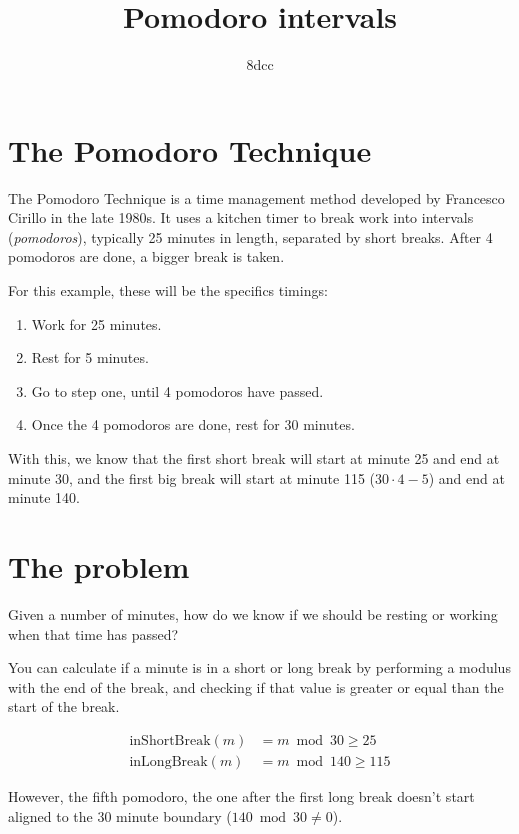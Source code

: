 \documentclass{amsart}
\title{Pomodoro intervals}
\author{8dcc}
\begin{document}
\maketitle

\section{The Pomodoro Technique}

The Pomodoro Technique is a time management method developed by Francesco
Cirillo in the late 1980s. It uses a kitchen timer to break work into intervals
(\textit{pomodoros}), typically 25 minutes in length, separated by short
breaks. After 4 pomodoros are done, a bigger break is taken.

For this example, these will be the specifics timings:

\begin{enumerate}
\item Work for 25 minutes.
\item Rest for 5 minutes.
\item Go to step one, until 4 pomodoros have passed.
\item Once the 4 pomodoros are done, rest for 30 minutes.
\end{enumerate}

With this, we know that the first short break will start at minute 25 and end at
minute 30, and the first big break will start at minute 115 ($30 \cdot 4 - 5$)
and end at minute 140.

\section{The problem}

Given a number of minutes, how do we know if we should be resting or working
when that time has passed?

You can calculate if a minute is in a short or long break by performing a
modulus with the end of the break, and checking if that value is greater or
equal than the start of the break.

\begin{align*}
  \text{inShortBreak}(m) &= m \bmod 30 \geq 25 \\
  \text{inLongBreak}(m)  &= m \bmod 140 \geq 115
\end{align*}

However, the fifth pomodoro, the one after the first long break doesn't start
aligned to the 30 minute boundary ($140 \bmod 30 \neq 0$).
\end{document}
